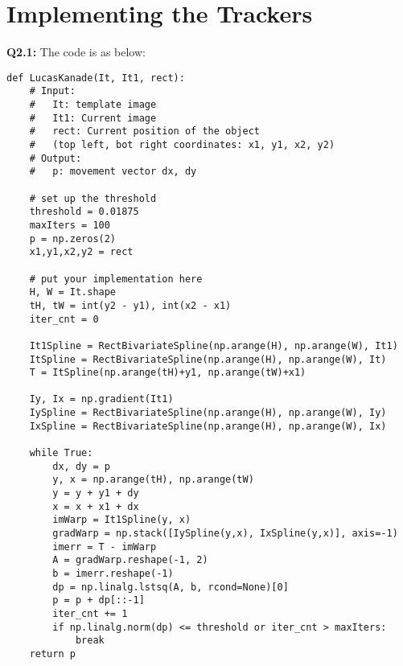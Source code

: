 \documentclass[
  course = {{16-720B Computer Vision}},
  quartile = {{1}},
  assignment = 6\ -\ Object\ Tracking\ in\ Videos,
  name = {{Kangle Deng}},
  email = {{kangled@andrew.cmu.edu}},
  firstexercise = 1
]{aga-homework}
\begin{document}
\section{Implementing the Trackers}
\noindent\textbf{Q2.1:} 
The code is as below:
\begin{lstlisting}
def LucasKanade(It, It1, rect):
    # Input: 
    #   It: template image
    #   It1: Current image
    #   rect: Current position of the object
    #   (top left, bot right coordinates: x1, y1, x2, y2)
    # Output:
    #   p: movement vector dx, dy
    
    # set up the threshold
    threshold = 0.01875
    maxIters = 100
    p = np.zeros(2)          
    x1,y1,x2,y2 = rect

    # put your implementation here
    H, W = It.shape
    tH, tW = int(y2 - y1), int(x2 - x1)
    iter_cnt = 0

    It1Spline = RectBivariateSpline(np.arange(H), np.arange(W), It1)
    ItSpline = RectBivariateSpline(np.arange(H), np.arange(W), It)
    T = ItSpline(np.arange(tH)+y1, np.arange(tW)+x1)

    Iy, Ix = np.gradient(It1)
    IySpline = RectBivariateSpline(np.arange(H), np.arange(W), Iy)
    IxSpline = RectBivariateSpline(np.arange(H), np.arange(W), Ix)

    while True:
        dx, dy = p
        y, x = np.arange(tH), np.arange(tW)
        y = y + y1 + dy
        x = x + x1 + dx
        imWarp = It1Spline(y, x)
        gradWarp = np.stack([IySpline(y,x), IxSpline(y,x)], axis=-1)
        imerr = T - imWarp
        A = gradWarp.reshape(-1, 2)
        b = imerr.reshape(-1)
        dp = np.linalg.lstsq(A, b, rcond=None)[0]
        p = p + dp[::-1]
        iter_cnt += 1
        if np.linalg.norm(dp) <= threshold or iter_cnt > maxIters:
            break
    return p
\end{lstlisting}
\end{document}
